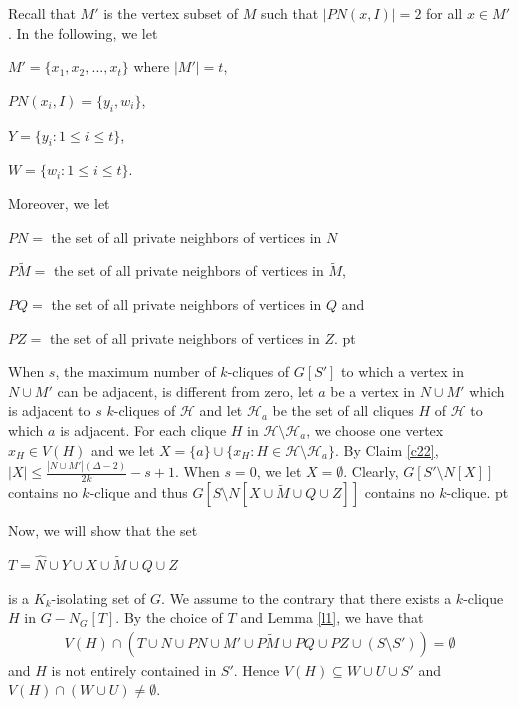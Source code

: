 \documentclass[11pt]{article}
\newcommand{\2}{ \vspace{0.2cm} }
\newcommand{\1}{ \vspace{0.1cm} }
\begin{document}
Recall that $M'$ is the vertex subset of $M$ such that $|PN(x, I)| = 2$ for all $x \in M'$. In the following, we let

\indent $M' = \{x_{1}, x_{2}, ..., x_{t}\}$ where $|M'| = t$,

\indent $PN(x_{i}, I) = \{y_{i}, w_{i}\}$,

\indent $Y = \{y_{i}: 1 \leq i \leq t\}$,

\indent $W = \{w_{i}: 1 \leq i \leq t\}$.

\noindent Moreover, we let

\indent $PN = $ the set of all private neighbors of vertices in $N$

\indent $P\tilde{M} =$ the set of all private neighbors of vertices in $\tilde{M}$,

\indent $PQ = $ the set of all private neighbors of vertices in $Q$ and

\indent $PZ = $ the set of all private neighbors of vertices in $Z$.
 pt






\indent When $s$, the maximum number of $k$-cliques of $ G[S']$ to which a vertex in $N \cup M'$ can be adjacent, is different from zero, let $a$ be a vertex in $N \cup M'$ which is adjacent to $s$  $k$-cliques of $\mathcal{H}$ and let $\mathcal{H}_{a}$ be the set of all cliques $H$ of $\mathcal{H}$ to which $a$ is adjacent. For each clique $H$ in $\mathcal{H} \setminus \mathcal{H}_{a}$, we choose one vertex $x_{H} \in V(H)$ and we let $X = \{a\} \cup \{x_{H} : H \in \mathcal{H} \setminus \mathcal{H}_{a}\}$. By Claim \ref{c22}, $|X| \leq \frac{|N \cup M'|(\Delta - 2)}{2k} - s + 1$. When $s=0$, we let $X=\emptyset$. Clearly,
$G[S' \setminus N[X]]$ contains no $k$-clique and thus $G[S \setminus N[X \cup \tilde{M} \cup Q \cup Z]]$ contains no $k$-clique.
 pt


\noindent Now, we will show that the set
\begin{center}
$T = \hat{N} \cup Y \cup X \cup \tilde{M} \cup Q \cup Z$
\end{center}
\noindent is a $K_k$-isolating set of $G$. We assume to the contrary that there exists a $k$-clique $H$ in $G - N_{G}[T]$. By the choice of $T$ and Lemma \ref{l1}, we have that
\begin{align}\label{e21}
V(H) \cap (T  \cup N \cup PN \cup M' \cup P\tilde{M} \cup PQ \cup PZ \cup (S \setminus S'))= \emptyset
\end{align}
and $H$ is not entirely contained in $S'$. Hence $V(H) \subseteq W \cup U \cup S'$ and  $V(H) \cap (W \cup U) \neq \emptyset$.
\end{document}
